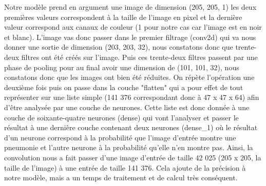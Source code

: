 Notre modèle prend en argument une image de dimension (205, 205, 1) les deux premières valeurs correspondent à la taille de l'image en pixel et la dernière valeur correspond aux canaux de couleur (1 pour notre cas car l'image est en noir et blanc). L'image vas donc passer dans le premier filtrage (conv2d) qui va nous donner une sortie de dimension (203, 203, 32), nous constatons donc que trente-deux filtres ont été créés sur l'image. Puis ces trente-deux filtres passent par une phase de pooling pour au final avoir une dimension de (101, 101, 32), nous constatons donc que les images ont bien été réduites. On répète l'opération une deuxième fois puis on passe dans la couche "flatten" qui a pour effet de tout représenter sur une liste simple (141 376 correspondant donc à 47 x 47 x 64) afin d'être analysée par une couche de neurones. Cette liste est donc donnée à une couche de soixante-quatre neurones (dense) qui vont l'analyser et passer le résultat à une dernière couche contenant deux neurones (dense\_1) où le résultat d'un neurone correspond à la probabilité que l'image d'entrée montre une pneumonie et l'autre neurone à la probabilité qu'elle n'en montre pas. Ainsi, la convolution nous a fait passer d'une image d'entrée de taille 42 025 (205 x 205, la taille de l'image) à une entrée de taille 141 376. Cela ajoute de la précision à notre modèle, mais a un temps de traitement et de calcul très conséquent. 


